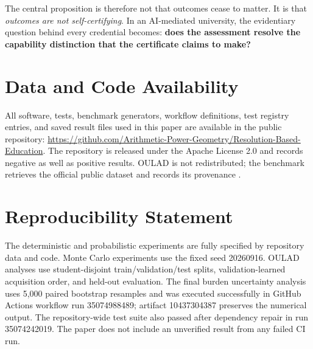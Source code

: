 \documentclass[11pt]{article}
\begin{document}
The central proposition is therefore not that outcomes cease to matter. It is that \emph{outcomes are not self-certifying}. In an AI-mediated university, the evidentiary question behind every credential becomes: \textbf{does the assessment resolve the capability distinction that the certificate claims to make?}

\section*{Data and Code Availability}
All software, tests, benchmark generators, workflow definitions, test registry entries, and saved result files used in this paper are available in the public repository: \url{https://github.com/Arithmetic-Power-Geometry/Resolution-Based-Education}. The repository is released under the Apache License 2.0 and records negative as well as positive results. OULAD is not redistributed; the benchmark retrieves the official public dataset and records its provenance \parencite{kuzilek2017oulad}.

\section*{Reproducibility Statement}
The deterministic and probabilistic experiments are fully specified by repository data and code. Monte Carlo experiments use the fixed seed 20260916. OULAD analyses use student-disjoint train/validation/test splits, validation-learned acquisition order, and held-out evaluation. The final burden uncertainty analysis uses 5,000 paired bootstrap resamples and was executed successfully in GitHub Actions workflow run 35074988489; artifact 10437304387 preserves the numerical output. The repository-wide test suite also passed after dependency repair in run 35074242019. The paper does not include an unverified result from any failed CI run.

\printbibliography
\end{document}

